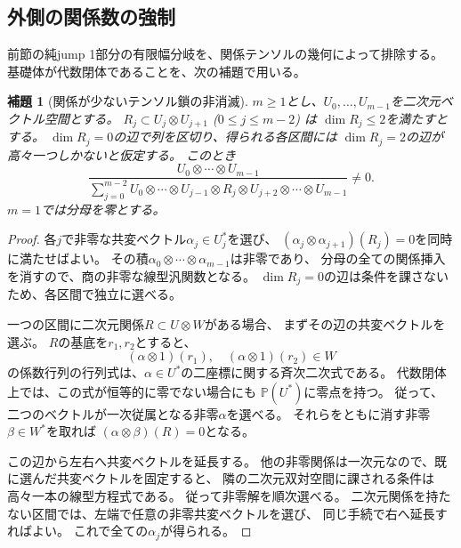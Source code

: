 \documentclass[11pt,a4paper]{ltjsarticle}
\newtheorem{lemma}[theorem]{補題}
\theoremstyle{definition}
\begin{document}
\subsection{外側の関係数の強制}
\label{idx:sec:outer-relation-ranks}

前節の純jump 1部分の有限幅分岐を、関係テンソルの幾何によって排除する。
基礎体が代数閉体であることを、次の補題で用いる。

\begin{lemma}[関係が少ないテンソル鎖の非消滅]
\label{idx:lem:tensor-chain-nonzero}
$m\geq1$とし、$U_0,\ldots,U_{m-1}$を二次元ベクトル空間とする。
$R_j\subset U_j\otimes U_{j+1}$ ($0\leq j\leq m-2$) は
$\dim R_j\leq2$を満たすとする。
$\dim R_j=0$の辺で列を区切り、得られる各区間には
$\dim R_j=2$の辺が高々一つしかないと仮定する。
このとき
\[
\frac{U_0\otimes\cdots\otimes U_{m-1}}
{\displaystyle\sum_{j=0}^{m-2}
 U_0\otimes\cdots\otimes U_{j-1}\otimes R_j
 \otimes U_{j+2}\otimes\cdots\otimes U_{m-1}}
\ne0.
\]
$m=1$では分母を零とする。
\end{lemma}
\begin{proof}
各$j$で非零な共変ベクトル$\alpha_j\in U_j^*$を選び、
$(\alpha_j\otimes\alpha_{j+1})(R_j)=0$を同時に満たせばよい。
その積$\alpha_0\otimes\cdots\otimes\alpha_{m-1}$は非零であり、
分母の全ての関係挿入を消すので、商の非零な線型汎関数となる。
$\dim R_j=0$の辺は条件を課さないため、各区間で独立に選べる。

一つの区間に二次元関係$R\subset U\otimes W$がある場合、
まずその辺の共変ベクトルを選ぶ。
$R$の基底を$r_1,r_2$とすると、
\[
(\alpha\otimes1)(r_1),\quad(\alpha\otimes1)(r_2)\in W
\]
の係数行列の行列式は、$\alpha\in U^*$の二座標に関する斉次二次式である。
代数閉体上では、この式が恒等的に零でない場合にも
$\mathbb P(U^*)$に零点を持つ。
従って、二つのベクトルが一次従属となる非零$\alpha$を選べる。
それらをともに消す非零$\beta\in W^*$を取れば
$(\alpha\otimes\beta)(R)=0$となる。

この辺から左右へ共変ベクトルを延長する。
他の非零関係は一次元なので、既に選んだ共変ベクトルを固定すると、
隣の二次元双対空間に課される条件は高々一本の線型方程式である。
従って非零解を順次選べる。
二次元関係を持たない区間では、左端で任意の非零共変ベクトルを選び、
同じ手続で右へ延長すればよい。
これで全ての$\alpha_j$が得られる。
\end{proof}
\end{document}
